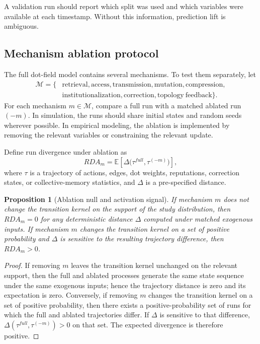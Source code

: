 \documentclass[11pt]{article}
\newtheorem{proposition}{Proposition}
\theoremstyle{remark}
\begin{document}
A validation run should report which split was used and which variables were
available at each timestamp. Without this information, prediction lift is
ambiguous.

\subsection{Mechanism ablation protocol}\label{mechanism-ablation-protocol}

The full dot-field model contains several mechanisms. To test them separately,
let
\[
\begin{aligned}
\mathcal M=\{&\mathrm{retrieval},\mathrm{access},\mathrm{transmission},
\mathrm{mutation},\mathrm{compression},\\
&\mathrm{institutionalization},\mathrm{correction},
\mathrm{topology\ feedback}\}.
\end{aligned}
\]
For each mechanism \(m\in\mathcal M\), compare a full run with a matched ablated
run \((-m)\). In simulation, the runs should share initial states and random
seeds wherever possible. In empirical modeling, the ablation is implemented by
removing the relevant variables or constraining the relevant update.

Define run divergence under ablation as
\[
RDA_m=
\mathbb E\left[\Delta\big(\tau^{full},\tau^{(-m)}\big)\right],
\]
where \(\tau\) is a trajectory of actions, edges, dot weights, reputations,
correction states, or collective-memory statistics, and \(\Delta\) is a
pre-specified distance.

\begin{proposition}[Ablation null and activation signal]\label{prop:ablation-null-activation}
If mechanism \(m\) does not change the transition kernel on the support of the
study distribution, then \(RDA_m=0\) for any deterministic distance \(\Delta\)
computed under matched exogenous inputs. If mechanism \(m\) changes the
transition kernel on a set of positive probability and \(\Delta\) is sensitive
to the resulting trajectory difference, then \(RDA_m>0\).
\end{proposition}

\begin{proof}
If removing \(m\) leaves the transition kernel unchanged on the relevant
support, then the full and ablated processes generate the same state sequence
under the same exogenous inputs; hence the trajectory distance is zero and its
expectation is zero. Conversely, if removing \(m\) changes the transition kernel
on a set of positive probability, then there exists a positive-probability set
of runs for which the full and ablated trajectories differ. If \(\Delta\) is
sensitive to that difference, \(\Delta(\tau^{full},\tau^{(-m)})>0\) on that set.
The expected divergence is therefore positive.
\end{proof}
\end{document}
